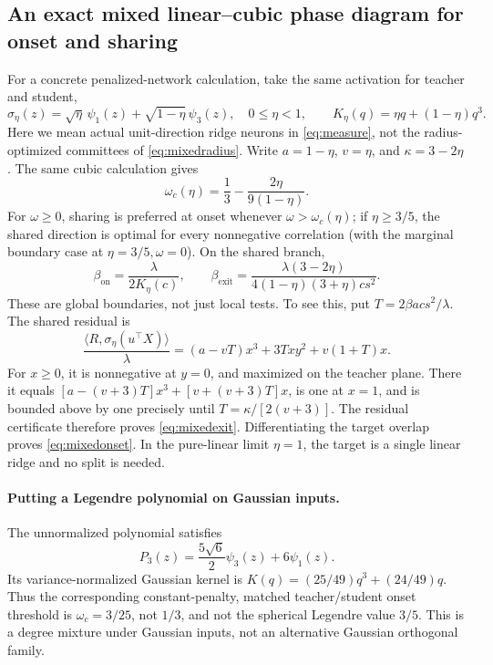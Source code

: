 \documentclass[11pt]{article}
\newcommand{\ip}[2]{\langle #1,#2\rangle}
\newcommand{\on}{\mathrm{on}}
\newcommand{\exit}{\mathrm{exit}}
\theoremstyle{remark}
\begin{document}
\subsection{An exact mixed linear--cubic phase diagram for onset and sharing}
For a concrete penalized-network calculation, take the same activation
for teacher and student,
\begin{equation}
 \sigma_\eta(z)=\sqrt\eta\,\psi_1(z)+\sqrt{1-\eta}\,\psi_3(z),
 \quad 0\leq\eta<1,
 \qquad K_\eta(q)=\eta q+(1-\eta)q^3.
\end{equation}
Here we mean actual unit-direction ridge neurons in
\eqref{eq:measure}, not the radius-optimized committees of
\eqref{eq:mixedradius}. Write $a=1-\eta$, $v=\eta$, and $\kappa=3-2\eta$.
The same cubic calculation gives
\begin{equation}\label{eq:mixedonset}
 \omega_c(\eta)=\frac13-\frac{2\eta}{9(1-\eta)}.
\end{equation}
For $\omega\geq0$, sharing is preferred at onset whenever
$\omega>\omega_c(\eta)$; if $\eta\geq3/5$, the shared direction is
optimal for every nonnegative correlation (with the marginal boundary
case at $\eta=3/5,\omega=0$). On the shared branch,
\begin{equation}\label{eq:mixedexit}
 \beta_\on=\frac\lambda{2K_\eta(c)},\qquad
 \boxed{\beta_\exit=
 \frac{\lambda(3-2\eta)}{4(1-\eta)(3+\eta)cs^2}.}
\end{equation}
These are global boundaries, not just local tests. To see this, put
$T=2\beta a cs^2/\lambda$. The shared residual is
\begin{equation}
 \frac{\ip R{\sigma_\eta(u^\top X)}}\lambda
   =(a-vT)x^3+3Txy^2+v(1+T)x.
\end{equation}
For $x\geq0$, it is nonnegative at $y=0$, and maximized on the teacher
plane. There it equals
$[a-(v+3)T]x^3+[v+(v+3)T]x$, is one at $x=1$, and is bounded above
by one precisely until $T=\kappa/[2(v+3)]$. The residual certificate
therefore proves \eqref{eq:mixedexit}. Differentiating the target overlap
proves \eqref{eq:mixedonset}. In the pure-linear limit $\eta=1$, the
target is a single linear ridge and no split is needed.

\paragraph{Putting a Legendre polynomial on Gaussian inputs.}
The unnormalized polynomial satisfies
\begin{equation}
 P_3(z)=\frac{5\sqrt6}{2}\psi_3(z)+6\psi_1(z).
\end{equation}
Its variance-normalized Gaussian kernel is
$K(q)=(25/49)q^3+(24/49)q$. Thus the corresponding constant-penalty,
matched teacher/student onset threshold is $\omega_c=3/25$, not
$1/3$, and not the spherical Legendre value $3/5$. This is a degree
mixture under Gaussian inputs, not an alternative Gaussian orthogonal family.
\end{document}
